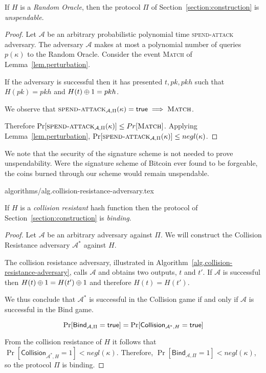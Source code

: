 \begin{theorem}[Unspendability]
  If $H$ is a \emph{Random Oracle}, then the protocol $\Pi$ of Section~\ref{section:construction} is \emph{unspendable}.
\end{theorem}
\begin{proof}
  Let $\mathcal{A}$ be an arbitrary probabilistic polynomial time \textsc{spend-attack} adversary.
  The adversary $\mathcal{A}$ makes at most a polynomial number of queries $p(\kappa)$ to the Random Oracle.
  Consider the event \textsc{Match} of Lemma~\ref{lem.perturbation}.

  If the adversary is successful then it has presented $t, pk, pkh$ such that $H(pk) = pkh$ and $H(t) \oplus 1 = pkh$.

  We observe that $\textsc{spend-attack}_{\mathcal{A}, \Pi}(\kappa) = \mathsf{true} \implies \textsc{Match}$.

  Therefore $\Pr[\textsc{spend-attack}_{\mathcal{A}, \Pi}(\kappa)] \leq Pr[\textsc{Match}]$. Applying Lemma~\ref{lem.perturbation}, $\Pr[\textsc{spend-attack}_{\mathcal{A}, \Pi}(\kappa)] \leq negl(\kappa)$.
\end{proof}

We note that the security of the signature scheme is not needed to prove unspendability. Were the signature scheme of Bitcoin ever found to be forgeable, the coins burned through our scheme would remain unspendable.

{algorithms/alg.collision-resistance-adversary.tex}

\begin{theorem}[Binding]
  If $H$ is a \emph{collision resistant} hash function then the protocol of Section~\ref{section:construction} is \emph{binding}.
\end{theorem}
\begin{proof}
  Let $\mathcal{A}$ be an arbitrary adversary against $\Pi$.
  We will construct the Collision Resistance adversary $\mathcal{A}^*$ against $H$.

  The collision resistance adversary, illustrated in Algorithm~\ref{alg.collision-resistance-adversary}, calls $\mathcal{A}$ and obtains two outputs, $t$ and $t'$. If $\mathcal{A}$ is successful then $H(t) \oplus 1 = H(t') \oplus 1$ and therefore $H(t) = H(t')$.

  We thus conclude that $\mathcal{A^*}$ is successful in the \textsf{Collision} game if and only if $\mathcal{A}$ is successful in the \textsf{Bind} game.

  \[
    \Pr[\textsf{Bind}_{\mathcal{A},\Pi} = \mathsf{true}]
    =
    \Pr[\textsf{Collision}_{\mathcal{A}^*,H} = \mathsf{true}]
  \]

  From the collision resistance of $H$ it follows that $\Pr[\textsf{Collision}_{\mathcal{A}^*,H} = 1] < negl(\kappa)$. Therefore,
  $\Pr[\textsf{Bind}_{\mathcal{A},\Pi} = 1] < negl(\kappa)$, so
  the protocol $\Pi$ is binding.
\end{proof}

